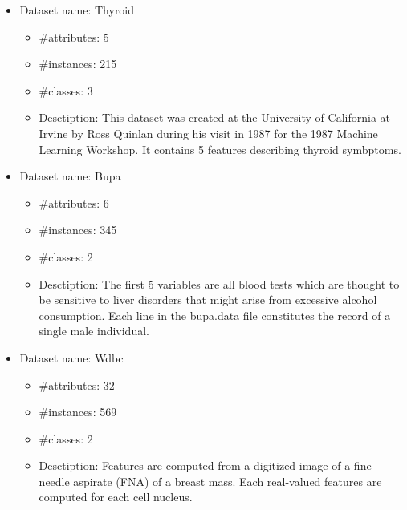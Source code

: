 \begin{itemize}
    \item Dataset name: Thyroid
        \begin{itemize}
            \item \#attributes: 5
            \item \#instances: 215
            \item \#classes: 3
            \item Desctiption:
                This dataset was created at the University of
                California at Irvine by Ross Quinlan during his visit in 1987 for
                the 1987 Machine Learning Workshop. It contains 5 features
                describing thyroid symbptoms.
        \end{itemize}

    \item Dataset name: Bupa
        \begin{itemize}
            \item \#attributes: 6
            \item \#instances: 345
            \item \#classes: 2
            \item Desctiption:
                The first 5 variables are all blood tests which are thought to
                be sensitive to liver disorders that might arise from excessive 
                alcohol consumption. Each line in the bupa.data file constitutes
                the record of a single male individual. 
        \end{itemize}

    \item Dataset name: Wdbc
        \begin{itemize}
            \item \#attributes: 32
            \item \#instances: 569
            \item \#classes: 2
            \item Desctiption:
                Features are computed from a digitized image of a fine needle aspirate (FNA) of a breast mass.
                Each real-valued features are computed for each cell nucleus.
        \end{itemize}
\end{itemize}
